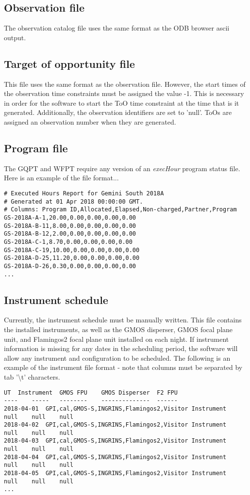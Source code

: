 \documentclass{article}
\begin{document}
\subsection{Observation file}
The observation catalog file uses the same format as the ODB browser ascii output.  

\subsection{Target of opportunity file}
This file uses the same format as the observation file.  However, the start times of the observation time constraints must be assigned the value -1.  This is necessary in order for the software to start the ToO time constraint at the time that is it generated.   Additionally, the observation identifiers are set to 'null'.  ToOs are assigned an observation number when they are generated. 

\subsection{Program file}
The GQPT and WFPT require any version of an \textit{execHour} program status file.  Here is an example of the file format...
\begin{lstlisting}
# Executed Hours Report for Gemini South 2018A
# Generated at 01 Apr 2018 00:00:00 GMT.
# Columns: Program ID,Allocated,Elapsed,Non-charged,Partner,Program
GS-2018A-A-1,20.00,0.00,0.00,0.00,0.00
GS-2018A-B-11,8.00,0.00,0.00,0.00,0.00
GS-2018A-B-12,2.00,0.00,0.00,0.00,0.00
GS-2018A-C-1,8.70,0.00,0.00,0.00,0.00
GS-2018A-C-19,10.00,0.00,0.00,0.00,0.00
GS-2018A-D-25,11.20,0.00,0.00,0.00,0.00
GS-2018A-D-26,0.30,0.00,0.00,0.00,0.00
...
\end{lstlisting}


\subsection{Instrument schedule}
Currently, the instrument schedule must be manually written.  This file contains the installed instruments, as well as the GMOS disperser, GMOS focal plane unit, and Flamingos2 focal plane unit installed on each night.  If instrument information is missing for any dates in the scheduling period, the software will allow any instrument and configuration to be scheduled. The following is an example of the instrument file format - note that columns must be separated by tab '\textbackslash t'  characters.
\begin{lstlisting}
UT	Instrument	GMOS FPU	GMOS Disperser	F2 FPU
----	-----	--------	--------------	------
2018-04-01	GPI,cal,GMOS-S,INGRINS,Flamingos2,Visitor Instrument	null	null	null
2018-04-02	GPI,cal,GMOS-S,INGRINS,Flamingos2,Visitor Instrument	null	null	null
2018-04-03	GPI,cal,GMOS-S,INGRINS,Flamingos2,Visitor Instrument	null	null	null
2018-04-04	GPI,cal,GMOS-S,INGRINS,Flamingos2,Visitor Instrument	null	null	null
2018-04-05	GPI,cal,GMOS-S,INGRINS,Flamingos2,Visitor Instrument	null	null	null
...
\end{lstlisting}
\end{document}
